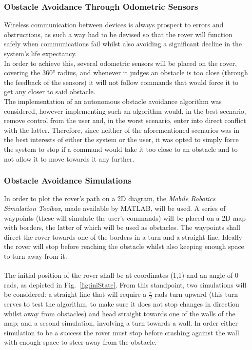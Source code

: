 \subsubsection{Obstacle Avoidance Through Odometric Sensors}
Wireless communication between devices is always prospect to errors and obstructions, as such a way had to be devised so that the rover will function safely when communications fail whilst also avoiding a significant decline in the system's life expectancy.\\In order to achieve this, several odometric sensors will be placed on the rover, covering the \ang{360} radius, and whenever it judges an obstacle is too close (through the feedback of the sensors) it will not follow commands that would force it to get any closer to said obstacle.\\The implementation of an autonomous obstacle avoidance algorithm was considered, however implementing such an algorithm would, in the best scenario, remove control from the user and, in the worst scenario, enter into direct conflict with the latter. Therefore, since neither of the aforementioned scenarios was in the best interests of either the system or the user, it was opted to simply force the system to stop if a command would take it too close to an obstacle and to not allow it to move towards it any further.
\subsubsection{Obstacle Avoidance Simulations}
In order to plot the rover's path on a 2D diagram, the \textit{Mobile Robotics Simulation Toolbox}, made available by MATLAB, will be used. A series of waypoints  (these will simulate the user's commands) will be placed on a 2D map with borders, the latter of which will be used as obstacles. The waypoints shall direct the rover towards one of the borders in a turn and a straight line. Ideally the rover will stop before reaching the obstacle whilst also keeping enough space to turn away from it.\\
\\
The initial position of the rover shall be at coordinates (1,1) and an angle of 0 rads, as depicted in Fig.~\ref{fig:iniState}. 
From this standpoint, two simulations will be considered: a straight line that will require a $\frac{\pi}{2}$ rads turn upward (this turn serves to test the algorithm, to make sure it does not stop changes in direction whilst away from obstacles) and head straight towards one of the walls of the map;
and a second simulation, involving a turn towards a wall. In order either simulation to be a success the rover must stop before crashing against the wall with enough space to steer away from the obstacle.

